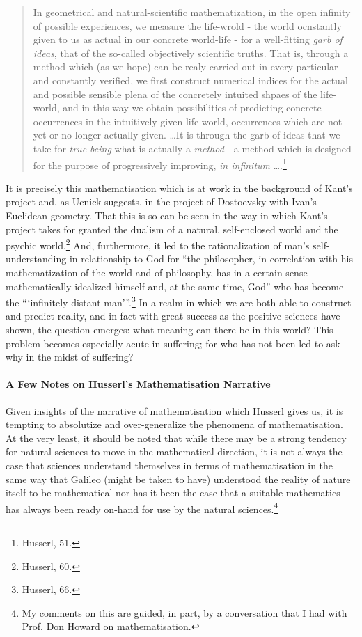 \documentclass[12pt]{article}
\begin{document}
	\begin{quote}
	\singlespacing
	\footnotesize
	
	In geometrical and natural-scientific mathematization, in the open infinity of possible experiences, we measure the life-wrold - the world ocnstantly given to us as actual in our concrete world-life - for a well-fitting \emph{garb of ideas}, that of the so-called objectively scientific truths. That is, through a method which (as we hope) can be realy carried out in every particular and constantly verified, we first construct numerical indices for the actual and possible sensible plena of the concretely intuited shpaes of the life-world, and in this way we obtain possibilities of predicting concrete occurrences in the intuitively given life-world, occurrences which are not yet or no longer actually given. \ldots It is through the garb of ideas that we take for \emph{true being} what is actually a \emph{method} - a method which is designed for the purpose of progressively improving, \emph{in infinitum} \ldots.\footnote{Husserl, 51.}
	
	\end{quote}
	
	 It is precisely this mathematisation which is at work in the background of Kant's project and, as Ucnick suggests, in the project of Dostoevsky with Ivan's Euclidean geometry. That this is so can be seen in the way in which Kant's project takes for granted the dualism of a natural, self-enclosed world and the psychic world.\footnote{Husserl, 60.} And, furthermore, it led to the rationalization of man's self-understanding in relationship to God for ``the philosopher, in correlation with his mathematization of the world and of philosophy, has in a certain sense mathematically idealized himself and, at the same time, God'' who has become the ``\thinspace`infinitely distant man'\thinspace''.\footnote{Husserl, 66.} In a realm in which we are both able to construct and predict reality, and in fact with great success as the positive sciences have shown, the question emerges: what meaning can there be in this world? This problem becomes especially acute in suffering; for who has not been led to ask why in the midst of suffering?
	 
	 \paragraph*{A Few Notes on Husserl's Mathematisation Narrative}
	 
	 Given insights of the narrative of mathematisation which Husserl gives us, it is tempting to absolutize and over-generalize the phenomena of mathematisation. At the very least, it should be noted that while there may be a strong tendency for natural sciences to move in the mathematical direction, it is not always the case that sciences understand themselves in terms of mathematisation in the same way that Galileo (might be taken to have) understood the reality of nature itself to be mathematical nor has it been the case that a suitable mathematics has always been ready on-hand for use by the natural sciences.\footnote{My comments on this are guided, in part, by a conversation that I had with Prof. Don Howard on mathematisation.}
	 
\end{document}
